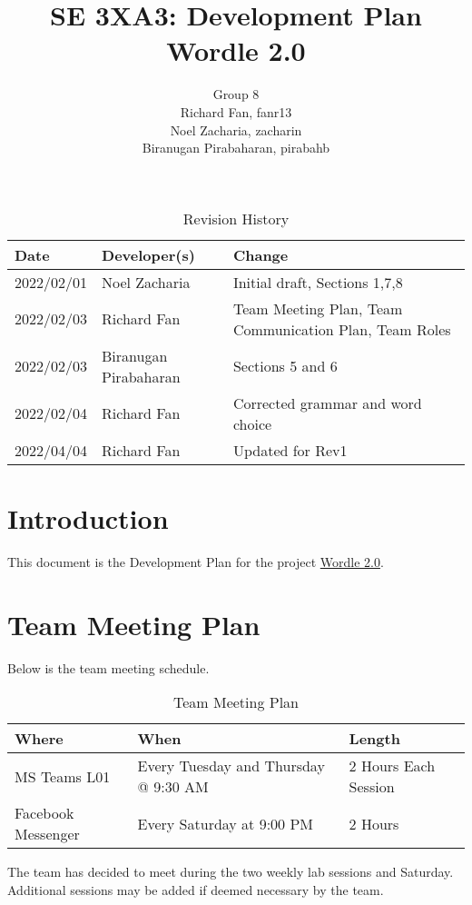 \documentclass{article}
\title{SE 3XA3: Development Plan\\Wordle 2.0}
\author{Group 8
	\\ Richard Fan, fanr13
	\\ Noel Zacharia, zacharin
	\\ Biranugan Pirabaharan, pirabahb
}
\date{}
\begin{document}
	
	\begin{table}[hp]
		\caption{Revision History} \label{TblRevisionHistory}
		\begin{tabularx}{\textwidth}{llX}
			\toprule
			\textbf{Date} & \textbf{Developer(s)} & \textbf{Change}\\
			\midrule
			2022/02/01 & Noel Zacharia & Initial draft, Sections 1,7,8\\
			2022/02/03 & Richard Fan & Team Meeting Plan, Team Communication 
			Plan, Team Roles\\
			2022/02/03 & Biranugan Pirabaharan & Sections 5 and 6\\
			2022/02/04 & Richard Fan & Corrected grammar and word choice\\
			2022/04/04 & Richard Fan & Updated for Rev1\\
			\bottomrule
		\end{tabularx}
	\end{table}
	
	\newpage
	
	\maketitle
	
	\section{Introduction}
	This document is the Development Plan for the project 
	\href{https://gitlab.cas.mcmaster.ca/zacharin/wordle_clone_3xa3_l01_group8}{Wordle
		2.0}.
	
	\section{Team Meeting Plan}
	Below is the team meeting schedule.
	\begin{table}[hp]
		\begin{tabularx}{\textwidth}{|l|l|X|}
			\toprule
			\textbf{Where} & \textbf{When} & \textbf{Length}\\
			\midrule
			MS Teams L01 & Every Tuesday and Thursday @ 9:30 AM & 2 Hours Each 
			Session\\
			Facebook Messenger & Every Saturday at 9:00 PM & 2 Hours\\
			\bottomrule
		\end{tabularx}
		\caption{Team Meeting Plan} \label{tab:teamMeetingPlan}
	\end{table}
	\newline
	The team has decided to meet during the two weekly lab sessions and 
	Saturday. Additional sessions may be added if deemed necessary by the team.
\end{document}

